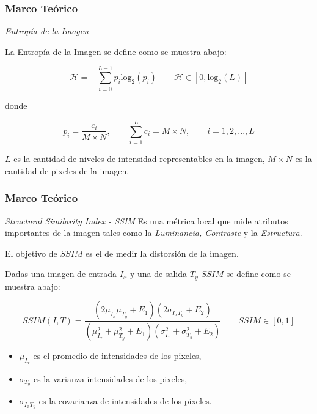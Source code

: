 \documentclass[usenames,dvipsnames]{beamer}
\begin{document}
\begin{frame} 
\frametitle{Marco Teórico} 
\begin{exampleblock}{\textit{Entropía de la Imagen}}

La Entropía de la Imagen se define como se muestra abajo:

\end{exampleblock}

\begin{equation}
\mathscr{H}= -\sum_{i=0}^{L-1} p_i \text{log}_2(p_i) \qquad \mathscr{H} \in [0,\text{log}_2(L)]
\end{equation}

donde

\begin{equation}
p_i=\frac{c_i}{M \times N}, \qquad \sum_{i=1}^L c_i = M \times N, \qquad i= 1,2, ..., L
\end{equation}

$L$ es la cantidad de niveles de intensidad representables en la imagen, $M \times N$ es la cantidad de pixeles de la imagen.

\end{frame}    

\begin{frame} 

\frametitle{Marco Teórico} 
\begin{exampleblock}{\textit{Structural Similarity Index - SSIM}}
Es una métrica local que mide atributos importantes de la imagen tales como la \textit{Luminancia, Contraste} y la \textit{Estructura}.

El objetivo de $SSIM$ es el de medir la distorsión de la imagen.

Dadas una imagen de entrada $I_x$ y una de salida $T_y$ $SSIM$ se define como se muestra abajo:

\end{exampleblock}
\vspace{-0.5cm}
\begin{equation}
SSIM(I,T) = \frac{(2\mu_{I_x} \mu_{T_y}+E_1)(2\sigma_{I_xT_y}+E_2)}{(\mu^2_{I_x}+\mu^2_{T_y}+E_1)(\sigma^2_{I_x} + \sigma^2_{T_y}+E_2)} \qquad SSIM \in [0,1]
\end{equation}

\begin{itemize}
	\item $\mu_{I_x}$ es el promedio de intensidades de los pixeles,
	\item $\sigma_{T_y}$ es la varianza intensidades de los pixeles,
	\item $\sigma_{I_xT_y}$ es la covarianza de intensidades de los pixeles.
\end{itemize}

\end{frame}  
\end{document}
